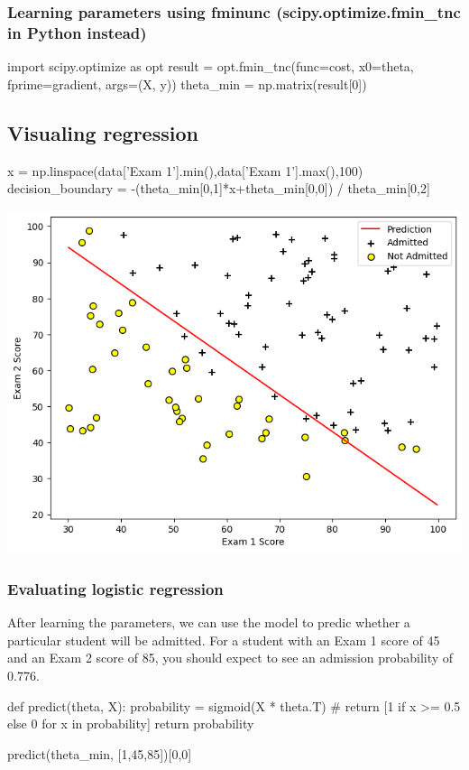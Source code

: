 \documentclass[a4paper, 12pt]{book}
\begin{document}
	 		\subsubsection{Learning parameters using fminunc (scipy.optimize.fmin\_tnc in Python instead) }
	  \begin{python}
	  	
	import scipy.optimize as opt
	result = opt.fmin_tnc(func=cost, x0=theta, fprime=gradient, args=(X, y))	
	theta_min = np.matrix(result[0])
	 \end{python}
 			\subsection{Visualing regression}
 	\begin{python}
 		
	x = np.linspace(data['Exam 1'].min(),data['Exam 1'].max(),100)
	decision_boundary = -(theta_min[0,1]*x+theta_min[0,0]) / theta_min[0,2]
 	\end{python}
	 \includegraphics[width=15cm]{boundary}
	 		\subsubsection{Evaluating logistic regression} 
	 After learning the parameters, we can use the model to predic whether a particular student will be admitted. For a student with an Exam 1 score of 45 and an Exam 2 score of 85, you should expect to see an admission probability of 0.776.
	 
	 \begin{python}
	 	
	def predict(theta, X):
		probability = sigmoid(X * theta.T)
		# return [1 if x >= 0.5 else 0 for x in probability]
	 	return probability
	 	
	predict(theta_min, [1,45,85])[0,0]
	 \end{python}
\end{document}
